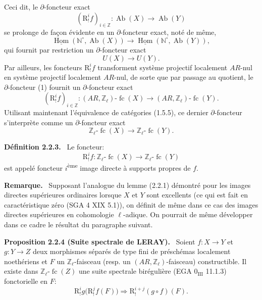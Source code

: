 \documentclass[11pt]{article}
\newenvironment{statement}[1]{\par\medskip\noindent\textbf{#1.}\ }{\par\medskip}
\DeclareMathOperator{\Hom}{Hom}
\providecommand{\uHom}{\underline{\Hom}}
\providecommand{\Hom}{\operatorname{Hom}}
\providecommand{\Ab}{\operatorname{Ab}}
\providecommand{\fc}{\operatorname{fc}}
\providecommand{\Ab}{\operatorname{Ab}}
\providecommand{\Hom}{\operatorname{Hom}}
\begin{document}
Ceci dit, le \(\partial\)-foncteur exact
\[
(\mathrm{R}^i_!f)_{i\in\mathbb Z}:\Ab(X)\longrightarrow \Ab(Y)
\]
se prolonge de façon évidente en un \(\partial\)-foncteur exact, noté de même,
\[
\uHom(\mathbb N^\circ,\Ab(X))\longrightarrow \uHom(\mathbb N^\circ,\Ab(Y)),
\]
qui fournit par restriction un \(\partial\)-foncteur exact
\[
U(X)\longrightarrow U(Y).
\tag{1}
\]
Par ailleurs, les foncteurs \(\mathrm{R}^i_!f\) transforment système projectif localement \(AR\)-nul en système projectif localement \(AR\)-nul, de sorte que par passage au
quotient, le \(\partial\)-foncteur (1) fournit un \(\partial\)-foncteur exact%
\[
(\mathrm{R}^i_!f)_{i\in\mathbb Z}:(AR,\mathbb Z_\ell)\text{-}\fc(X)
\longrightarrow (AR,\mathbb Z_\ell)\text{-}\fc(Y).
\]
Utilisant maintenant l'équivalence de catégories (1.5.5), ce dernier \(\partial\)-foncteur s'interprète comme un \(\partial\)-foncteur exact
\[
\mathbb Z_\ell\text{-}\fc(X)\longrightarrow \mathbb Z_\ell\text{-}\fc(Y).
\]

\begin{statement}{Définition 2.2.3}
Le foncteur:
\[
\mathrm{R}^i_!f:\mathbb Z_\ell\text{-}\fc(X)\longrightarrow \mathbb Z_\ell\text{-}\fc(Y)
\]
est appelé foncteur \(i\)\textsuperscript{ème} image directe à supports propres de \(f\).
\end{statement}

\begin{statement}{Remarque}
Supposant l'analogue du lemme (2.2.1) démontré pour les images directes supérieures ordinaires lorsque \(X\) et \(Y\) sont excellents (ce qui est fait en caractéristique zéro (SGA 4 XIX 5.1)), on définit de même dans ce cas des images directes supérieures en cohomologie \(\ell\)-adique. On pourrait de même développer dans ce cadre le résultat du paragraphe suivant.
\end{statement}

\begin{statement}{Proposition 2.2.4 (Suite spectrale de LERAY)}
Soient \(f:X\to Y\) et \(g:Y\to Z\) deux morphismes séparés de type fini de préschémas localement noethériens et \(F\) un \(\mathbb Z_\ell\)-faisceau (resp. un \((AR,\mathbb Z_\ell)\)-faisceau) constructible. Il existe dans \(\mathbb Z_\ell\text{-}\fc(Z)\) une suite spectrale birégulière (EGA \(0_{\mathrm{III}}\) 11.1.3) fonctorielle en \(F\):
\[
\mathrm{R}^i_!g\bigl(\mathrm{R}^j_!f(F)\bigr)\Longrightarrow \mathrm{R}^{i+j}_!(g\circ f)(F).
\]
\end{statement}
\end{document}
